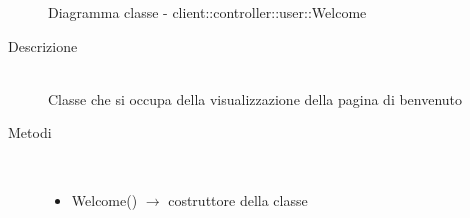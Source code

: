\begin{figure}[H]
	\centering
	\caption{Diagramma classe - client::controller::user::Welcome}
\end{figure}\begin{description}
\item[Descrizione] \hfill \\
Classe che si occupa della visualizzazione della pagina di benvenuto
\item[Metodi] \hfill \\
\vspace{-7mm}
\begin{itemize}
	\item Welcome() $\rightarrow$ costruttore della classe
\end{itemize}

\end{description}

